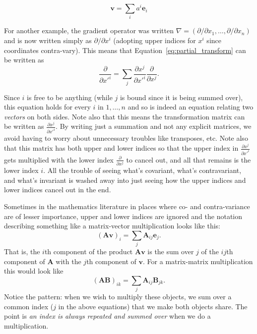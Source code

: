 \documentclass[../master.tex]{subfiles}
\begin{document}
	\begin{equation}
		\mathbf v = \sum_{i} a^i \mathbf e_i
	\end{equation}
	
	For another example, the gradient operator was written $\nabla = (\partial/\partial x_1, \dots, \partial/\partial x_n)$ and is now written simply as $\partial/\partial x^i$ (adopting upper indices for $x^i$ since coordinates contra-vary). This means that Equation~\eqref{eq:partial_transform} can be written as
	\begin{equation}\label{eq:partial_transform2}
		\frac{\partial}{\partial {x'}^i} = \sum_{j} \frac{\partial x^j}{\partial {x'}^i} \frac{\partial}{\partial x^j}.
	\end{equation}
	
	Since $i$ is free to be anything (while $j$ is bound since it is being summed over), this equation holds for every $i$ in $1,\dots, n$ and so is indeed an equation relating two \emph{vectors} on both sides. Note also that this means the transformation matrix can be written as $\frac{\partial x^j}{\partial {x'}^i}$. By writing just a summation and not any explicit matrices, we avoid having to worry about unnecessary troubles like transposes, etc. Note also that this matrix has both upper and lower indices so that the upper index in $\frac{\partial x^j}{\partial {x'}^i}$ gets multiplied with the lower index $\frac{\partial}{\partial x^j}$ to cancel out, and all that remains is the lower index $i$. All the trouble of seeing what's covariant, what's contravariant, and what's invariant is washed away into just seeing how the upper indices and lower indices cancel out in the end.
	
	Sometimes in the mathematics literature in places where co- and contra-variance are of lesser importance, upper and lower indices are ignored and the notation describing something like a matrix-vector multiplication looks like this:
	\begin{equation*}
		(\mathbf A \mathbf v)_i = \sum_{j} \mathbf A_{ij} \mathbf e_j.
	\end{equation*}
	That is, the $i$th component of the product $\mathbf A \mathbf v$ is the sum over $j$ of the $ij$th component of $\mathbf A$ with the $j$th component of $\mathbf v$. For a matrix-matrix multiplication this would look like
	\begin{equation*}
		(\mathbf A \mathbf{B})_{ik} = \sum_{j} \mathbf A_{ij} \mathbf B_{jk}.
	\end{equation*}
	Notice the pattern: when we wish to multiply these objects, we sum over a common index ($j$ in the above equations) that we make both objects share. The point is \emph{an index is always repeated and summed over} when we do a multiplication. 
	
\end{document}
